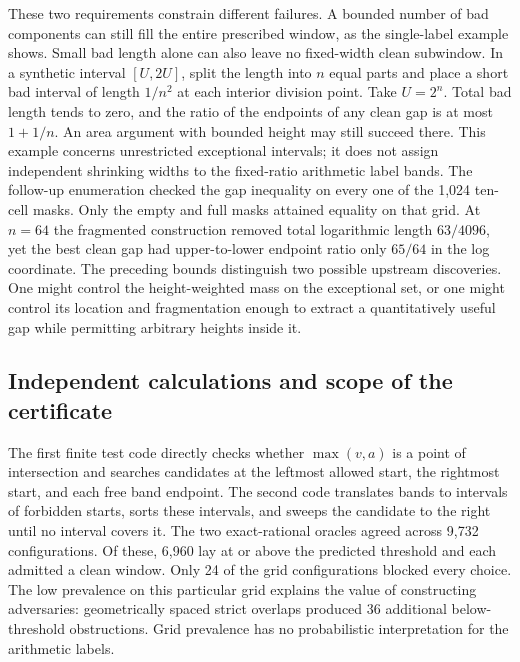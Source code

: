 \documentclass[12pt,letterpaper]{article}
\begin{document}
These two requirements constrain different failures. A bounded number of bad components can still fill the entire prescribed window, as the single-label example shows. Small bad length alone can also leave no fixed-width clean subwindow. In a synthetic interval \([U,2U]\), split the length into \(n\) equal parts and place a short bad interval of length \(1/n^2\) at each interior division point. Take \(U=2^n\). Total bad length tends to zero, and the ratio of the endpoints of any clean gap is at most \(1+1/n\). An area argument with bounded height may still succeed there. This example concerns unrestricted exceptional intervals; it does not assign independent shrinking widths to the fixed-ratio arithmetic label bands. The follow-up enumeration checked the gap inequality on every one of the 1,024 ten-cell masks. Only the empty and full masks attained equality on that grid. At \(n=64\) the fragmented construction removed total logarithmic length \(63/4096\), yet the best clean gap had upper-to-lower endpoint ratio only \(65/64\) in the log coordinate. The preceding bounds distinguish two possible upstream discoveries. One might control the height-weighted mass on the exceptional set, or one might control its location and fragmentation enough to extract a quantitatively useful gap while permitting arbitrary heights inside it.

\subsection{Independent calculations and scope of the certificate}
The first finite test code directly checks whether \(\max(v,a)\) is a point of intersection and searches candidates at the leftmost allowed start, the rightmost start, and each free band endpoint. The second code translates bands to intervals of forbidden starts, sorts these intervals, and sweeps the candidate to the right until no interval covers it. The two exact-rational oracles agreed across 9,732 configurations. Of these, 6,960 lay at or above the predicted threshold and each admitted a clean window. Only 24 of the grid configurations blocked every choice. The low prevalence on this particular grid explains the value of constructing adversaries: geometrically spaced strict overlaps produced 36 additional below-threshold obstructions. Grid prevalence has no probabilistic interpretation for the arithmetic labels.
\end{document}
